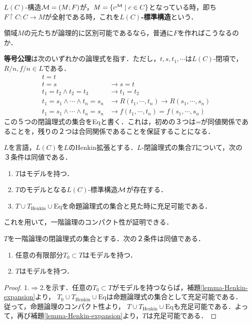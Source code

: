 \documentclass[uplatex, dvipdfmx]{jsreport}
\begin{document}
\begin{definition}
    $L(C)$-構造$\mathcal{M}=(M;F)$が，$M=\{c^{\mathcal{M}}\mid c\in C\}$となっている時，即ち$F\restriction C:C\to M$が全射である時，これを\textbf{$L(C)$-標準構造}という．
\end{definition}
\begin{remark}
    領域$M$の元たちが論理的に区別可能であるなら，普通に$F$を作ればこうなるのか．
\end{remark}
\begin{definition}\label{axiom-equiality}
    \textbf{等号公理}は次のいずれかの論理式を指す．ただし，$t,s,t_1,\cdots$は$L(C)$-閉項で，$R/n,f/n\in L$である．
    \begin{align*}
        t=t&\\
        t=s&\to s=t\\
        t_1=t_2\land t_2=t_3&\to t_1=t_2\\
        t_1=s_1\land\cdots\land t_n=s_n&\to R(t_1,\cdots,t_n)\to R(s_1,\cdots,s_n)\\
        t_1=s_1\land\cdots\land t_n=s_n&\to f(t_1,\cdots,t_n)=f(s_1,\cdots,s_n)
    \end{align*}
    この５つの閉論理式の集合をEqと書く．これは，初めの３つは=が同値関係であることを，残りの２つは合同関係であることを保証することになる．
\end{definition}

\begin{lemma}\label{lemma-Henkin-expansion}
    $L$を言語，$L(C)$を$L$のHenkin拡張とする．$L$-閉論理式の集合$T$について，次の３条件は同値である．
    \begin{enumerate}
        \item $T$はモデルを持つ．
        \item $T$のモデルとなる$L(C)$-標準構造$\mathcal{M}$が存在する．
        \item $T\cup T_\mathrm{Henkin}\cup\mathrm{Eq}$を命題論理式の集合と見た時に充足可能である．
    \end{enumerate}
\end{lemma}

これを用いて，一階論理のコンパクト性が証明できる．
\begin{theorem}
    $T$を一階論理の閉論理式の集合とする．次の２条件は同値である．
    \begin{enumerate}
        \item 任意の有限部分$T_0\subset T$はモデルを持つ．
        \item $T$はモデルを持つ．
    \end{enumerate}
\end{theorem}
\begin{proof}
    1.$\Rightarrow$2.を示す．任意の$T_0\subset T$がモデルを持つならば，補題\ref{lemma-Henkin-expansion}より，
    $T_0\cup T_\mathrm{Henkin}\cup\mathrm{Eq}$は命題論理式の集合として充足可能である．従って，命題論理のコンパクト性より，
    $T\cup T_\mathrm{Henkin}\cup\mathrm{Eq}$も充足可能である．よって，再び補題\ref{lemma-Henkin-expansion}より，$T$は充足可能である．
\end{proof}
\end{document}
